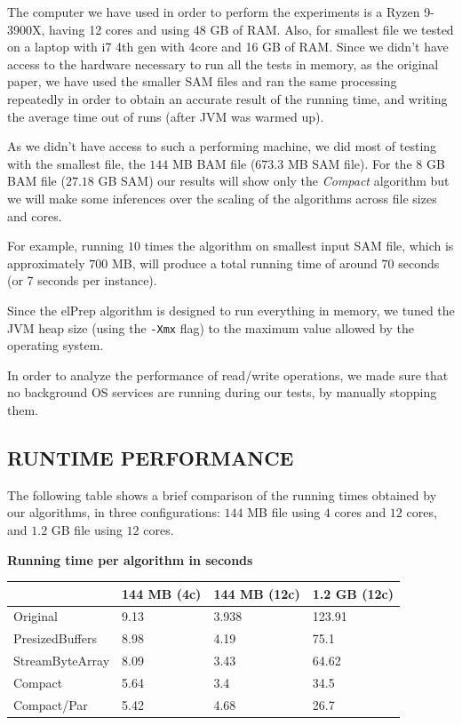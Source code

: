 \documentclass[a4paper,twoside]{article}
\begin{document}
The computer we have used in order to perform the experiments is a Ryzen 9-3900X, having 12 cores and using 48 GB of RAM\@. Also, for smallest file we tested on a laptop with i7 4th gen with 4core and 16 GB of RAM.
Since we didn't have access to the hardware necessary to run all the tests in memory, as the original paper, we have used the smaller SAM files and ran the same processing repeatedly in order to obtain an accurate result of the running time, and writing the average time out of runs (after JVM was warmed up).

As we didn't have access to such a performing machine, we did most of testing with the smallest file, the $144$ MB BAM file ($673.3$ MB SAM file). For the $8$ GB BAM file ($27.18$ GB SAM) our results will show only the {\textit{Compact} } algorithm but we will make some inferences over the scaling of the algorithms across file sizes and cores.

For example, running $10$ times the algorithm on smallest input SAM file, which is approximately $700$ MB, will produce a total running time of around $70$ seconds (or 7 seconds per instance). 

Since the elPrep algorithm is designed to run everything in memory, we tuned the JVM heap size (using the \texttt{-Xmx} flag) to the maximum value allowed by the operating system. 

In order to analyze the performance of read/write operations, we made sure that no background OS services are running during our tests, by manually stopping them.


\subsection{\uppercase{Runtime performance}}
\label{subsec:runtimeperf}

The following table shows a brief comparison of the running times obtained by our algorithms, in three configurations: $144$ MB file using $4$ cores and $12$ cores, and $1.2$ GB file using $12$ cores. 

\begin{small}
\begin{center}
\textbf{Running time per algorithm in seconds} \\
\begin{tabular}{|C{2cm}|C{1.2cm}|C{1.2cm}|C{1.2cm}|}
\hline
						& 144 MB (4c)	& 144 MB (12c)		& 1.2 GB (12c)	\\ \hline
Original				& 9.13 			& 3.938 			& 123.91 		\\ \hline
PresizedBuffers			& 8.98 			& 4.19 				& 75.1 			\\ \hline
StreamByteArray			& 8.09 			& 3.43 				& 64.62 		\\ \hline
Compact 				& 5.64 			& 3.4 	 			& 34.5			\\ \hline
Compact/Par 			& 5.42		    & 4.68				& 26.7 			\\ \hline
\end{tabular}
\end{center}
\end{small}
\end{document}

